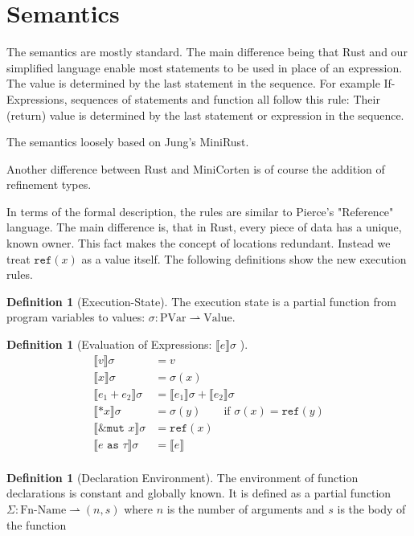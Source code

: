 \documentclass{book}
\newcommand{\code}[1]{\texttt{#1}}
\newcommand{\bbracket}[1]{\llbracket #1 \rrbracket}
\theoremstyle{definition}
\newtheorem{definition}[theorem]{Definition}
\begin{document}
\section{Semantics}

The semantics are mostly standard. The main difference being that Rust and our simplified language enable most statements to be used in place of an expression. The value is determined by the last statement in the sequence. For example If-Expressions, sequences of statements and function all follow this rule: Their (return) value is determined by the last statement or expression in the sequence.

The semantics loosely based on Jung's MiniRust.

Another difference between Rust and MiniCorten is of course the addition of refinement types.

In terms of the formal description, the rules are similar to Pierce's \cite[p. 166f]{pierce_types_2002-3} "Reference" language. %
The main difference is, that in Rust, every piece of data has a unique, known owner. This fact makes the concept of locations redundant. Instead we treat $\code{ref}(x)$ as a value itself. The following definitions show the new execution rules.

\begin{definition}[Execution-State]
  The execution state is a partial function from program variables to values: $\sigma : \text{PVar} \rightharpoonup \text{Value}$. 
\end{definition}


\begin{definition}[Evaluation of Expressions: $\bbracket{e} \sigma$ ]
  \begin{align*}
   \bbracket{v} \sigma &= v \\
   \bbracket{x} \sigma &= \sigma(x) \\
   \bbracket{e_1 + e_2} \sigma &= \bbracket{e_1} \sigma + \bbracket{e_2} \sigma \\
   \bbracket{*x} \sigma &= \sigma(y) \qquad \text{if } \sigma(x) = \code{ref}(y) \\
   \bbracket{\code{\&mut } x} \sigma &= \code{ref}(x) \\
   \bbracket{e \code{ as } \tau} \sigma &= \bbracket{e} \\
  \end{align*}
 \end{definition}
 

\begin{definition}[Declaration Environment]
  The environment of function declarations is constant and globally known. It is defined as a partial function $\Sigma : \text{Fn-Name} \rightharpoonup (n, s)$ where $n$ is the number of arguments and $s$ is the body of the function
\end{definition}
\end{document}
